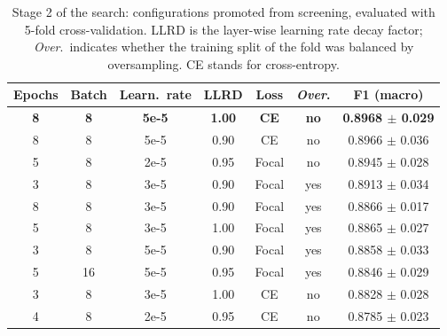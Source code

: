 \begin{table}[!t]
\centering
\caption{Stage 2 of the search: configurations promoted from screening, evaluated with 5-fold cross-validation. LLRD is the layer-wise learning rate decay factor; \emph{Over}.\ indicates whether the training split of the fold was balanced by oversampling. CE stands for cross-entropy.}
\label{tab:halving}
\begin{tabular}{ccccccc}
\toprule
Epochs & Batch & Learn.\ rate & LLRD & Loss & \emph{Over}. & F1 (macro) \\
\midrule
\textbf{8} & \textbf{8} & \textbf{5e-5} & \textbf{1.00} & \textbf{CE} & \textbf{no} & \textbf{0.8968 $\pm$ 0.029} \\
8 & 8 & 5e-5 & 0.90 & CE & no & 0.8966 $\pm$ 0.036 \\
5 & 8 & 2e-5 & 0.95 & Focal & no & 0.8945 $\pm$ 0.028 \\
3 & 8 & 3e-5 & 0.90 & Focal & yes & 0.8913 $\pm$ 0.034 \\
8 & 8 & 3e-5 & 0.90 & Focal & yes & 0.8866 $\pm$ 0.017 \\
5 & 8 & 3e-5 & 1.00 & Focal & yes & 0.8865 $\pm$ 0.027 \\
3 & 8 & 5e-5 & 0.90 & Focal & yes & 0.8858 $\pm$ 0.033 \\
5 & 16 & 5e-5 & 0.95 & Focal & yes & 0.8846 $\pm$ 0.029 \\
3 & 8 & 3e-5 & 1.00 & CE & no & 0.8828 $\pm$ 0.028 \\
4 & 8 & 2e-5 & 0.95 & CE & no & 0.8785 $\pm$ 0.023 \\
\bottomrule
\end{tabular}
\end{table}

